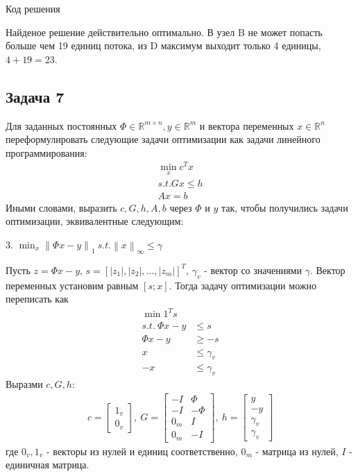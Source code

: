 \documentclass{article}
\newcommand{\R}{\mathbb{R}}
\newcommand{\RM}[2] {\mathbb{R}^{#1 \times #2}}
\newcommand{\norm}[1]{\left\lVert#1\right\rVert}
\begin{document}
    Код решения
    
    
    Найденое решение действительно оптимально. В узел B не может попасть больше чем 19 единиц потока, из D максимум выходит только 4 единицы, $4 + 19 = 23$.
    \bigbreak
    
    \subsection*{Задача 7}
    
    Для заданных постоянных $\Phi \in \RM{m}{n}, y \in \R^m$ и вектора переменных $x \in \R^n$ переформулировать следующие задачи оптимизации как задачи линейного программирования:
    \begin{align*}
        \min_x c^Tx\\
        s.t. Gx \le h\\
        Ax = b
    \end{align*}
    Иными словами, выразить $c, G, h, A, b$ через $\Phi$ и $y$ так, чтобы получились задачи оптимизации, эквивалентные следующим:
    \bigbreak
    
    3. $\min_x \norm{\Phi x - y}_1 \: s.t. \norm{x}_{\infty} \le \gamma$
    
    Пусть $z = \Phi x - y$, $s = [|z_1|, |z_2|, ..., |z_m|]^T$, $\gamma_v$ - вектор со значениями $\gamma$. Вектор переменных установим равным $[s; x]$. Тогда задачу оптимизации можно переписать как
    \begin{align*}
        \min 1^Ts\\
        s.t. \: \Phi x - y &\le s\\
        \Phi x - y &\ge -s\\
        x &\le \gamma_v \\
        -x &\le \gamma_v
    \end{align*}
    Выразми $c, G, h$:
    \begin{align*}
        c = \left[\begin{matrix} 1_v\\ 0_v \end{matrix} \right], \:
        G = \left[
            \begin{matrix}
                -I & \Phi \\
                -I & -\Phi \\
                0_m & I \\
                0_m & -I
            \end{matrix}
            \right], \:
        h = \left[
            \begin{matrix}
                y \\
                -y \\
                \gamma_v\\
                \gamma_v
            \end{matrix}
            \right]
    \end{align*}
    где $0_v, 1_v$ - векторы из нулей и единиц соответственно, $0_m$ - матрица из нулей, $I$ - единичная матрица.
    
\end{document}
